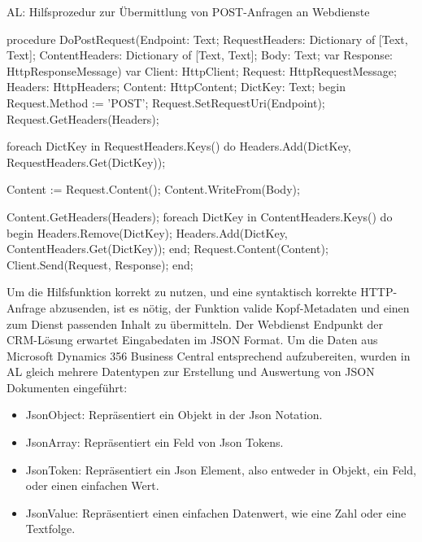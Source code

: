 \begin{program}  %
	\centering
	\caption{AL: Hilfsprozedur zur Übermittlung von POST-Anfragen an Webdienste}
	\label{prog:wsHelper}
	
	\begin{JavaCode}
procedure DoPostRequest(Endpoint: Text;
                        RequestHeaders: Dictionary of [Text, Text];
                        ContentHeaders: Dictionary of [Text, Text];
                        Body: Text;
                        var Response: HttpResponseMessage)
var
  Client: HttpClient;
  Request: HttpRequestMessage;
  Headers: HttpHeaders;
  Content: HttpContent;
  DictKey: Text;
begin
  Request.Method := 'POST';
  Request.SetRequestUri(Endpoint);
  Request.GetHeaders(Headers);

  foreach DictKey in RequestHeaders.Keys() do
    Headers.Add(DictKey, RequestHeaders.Get(DictKey));

  Content := Request.Content();
  Content.WriteFrom(Body);

  Content.GetHeaders(Headers);
  foreach DictKey in ContentHeaders.Keys() do begin
    Headers.Remove(DictKey);
    Headers.Add(DictKey, ContentHeaders.Get(DictKey));
  end;
  Request.Content(Content);
  Client.Send(Request, Response);
end;
	\end{JavaCode}
\end{program}
\pagebreak

Um die Hilfsfunktion korrekt zu nutzen, und eine syntaktisch korrekte HTTP-Anfrage abzusenden, ist es nötig, der Funktion valide Kopf-Metadaten und einen zum Dienst passenden Inhalt zu übermitteln. Der Webdienst Endpunkt der CRM-Lösung erwartet Eingabedaten im JSON Format. Um die Daten aus Microsoft Dynamics 356 Business Central entsprechend aufzubereiten, wurden in AL gleich mehrere Datentypen zur Erstellung und Auswertung von JSON Dokumenten eingeführt: 
\begin{itemize}
	\item JsonObject: Repräsentiert ein Objekt in der Json Notation.
	\item JsonArray: Repräsentiert ein Feld von Json Tokens.
	\item JsonToken: Repräsentiert ein Json Element, also entweder in Objekt, ein Feld, oder einen einfachen Wert.
	\item JsonValue: Repräsentiert einen einfachen Datenwert, wie eine Zahl oder eine Textfolge.
\end{itemize}
